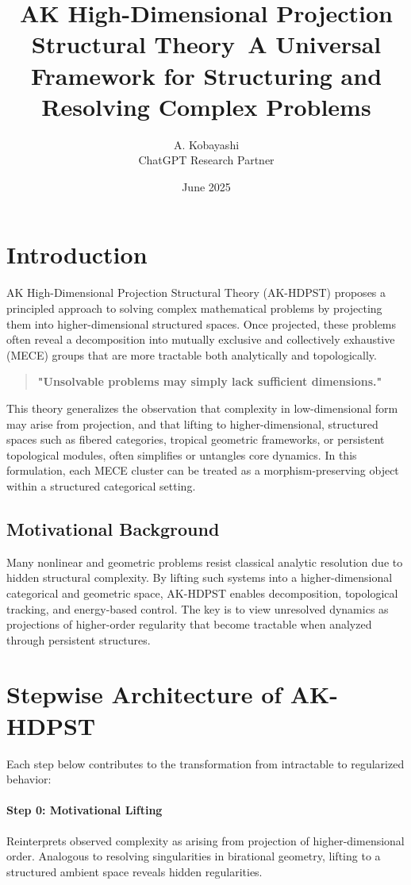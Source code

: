 \documentclass[11pt]{article}
\title{AK High-Dimensional Projection Structural Theory\ \large A Universal Framework for Structuring and Resolving Complex Problems}
\author{A. Kobayashi \\ ChatGPT Research Partner}
\date{June 2025}
\begin{document}
\maketitle

\section{Introduction}
AK High-Dimensional Projection Structural Theory (AK-HDPST) proposes a principled approach to solving complex mathematical problems by projecting them into higher-dimensional structured spaces. Once projected, these problems often reveal a decomposition into mutually exclusive and collectively exhaustive (MECE) groups that are more tractable both analytically and topologically.

\begin{quote}
\textbf{"Unsolvable problems may simply lack sufficient dimensions."}
\end{quote}

This theory generalizes the observation that complexity in low-dimensional form may arise from projection, and that lifting to higher-dimensional, structured spaces such as fibered categories, tropical geometric frameworks, or persistent topological modules, often simplifies or untangles core dynamics. In this formulation, each MECE cluster can be treated as a morphism-preserving object within a structured categorical setting.

\subsection*{Motivational Background}
Many nonlinear and geometric problems resist classical analytic resolution due to hidden structural complexity. By lifting such systems into a higher-dimensional categorical and geometric space, AK-HDPST enables decomposition, topological tracking, and energy-based control. The key is to view unresolved dynamics as projections of higher-order regularity that become tractable when analyzed through persistent structures.

\section{Stepwise Architecture of AK-HDPST}
Each step below contributes to the transformation from intractable to regularized behavior:

\paragraph{Step 0: Motivational Lifting} Reinterprets observed complexity as arising from projection of higher-dimensional order. Analogous to resolving singularities in birational geometry, lifting to a structured ambient space reveals hidden regularities.
\end{document}
